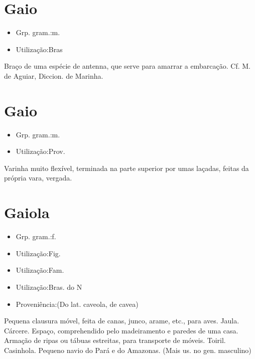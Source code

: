 \section{Gaio}
\begin{itemize}
\item {Grp. gram.:m.}
\end{itemize}
\begin{itemize}
\item {Utilização:Bras}
\end{itemize}
Braço de uma espécie de antenna, que serve para amarrar a embarcação. Cf. M. de Aguiar, \textunderscore Diccion. de Marinha\textunderscore .
\section{Gaio}
\begin{itemize}
\item {Grp. gram.:m.}
\end{itemize}
\begin{itemize}
\item {Utilização:Prov.}
\end{itemize}
Varinha muito flexível, terminada na parte superior por umas laçadas, feitas da própria vara, vergada.
\section{Gaiola}
\begin{itemize}
\item {Grp. gram.:f.}
\end{itemize}
\begin{itemize}
\item {Utilização:Fig.}
\end{itemize}
\begin{itemize}
\item {Utilização:Fam.}
\end{itemize}
\begin{itemize}
\item {Utilização:Bras. do N}
\end{itemize}
\begin{itemize}
\item {Proveniência:(Do lat. \textunderscore caveola\textunderscore , de \textunderscore cavea\textunderscore )}
\end{itemize}
Pequena clausura móvel, feita de canas, junco, arame, etc., para aves.
Jaula.
Cárcere.
Espaço, comprehendido pelo madeiramento e paredes de uma casa.
Armação de ripas ou tábuas estreitas, para transporte de móveis.
Toiril.
Casinhola.
Pequeno navio do Pará e do Amazonas. (Mais us. no gen. masculino)
